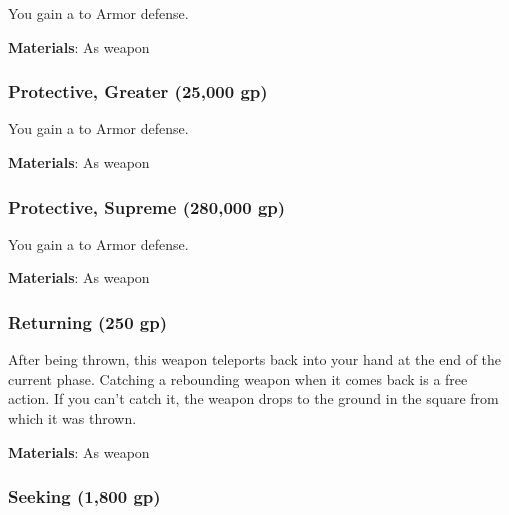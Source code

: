 You gain a   to Armor defense.



\vspace{0.25em}
\textbf{Materials}: As weapon


\lowercase{\hypertarget{item:Protective, Greater}{}}\label{item:Protective, Greater}
\hypertarget{item:Protective, Greater}{\subsubsection{Protective, Greater\hfill{} (25,000 gp)}}

You gain a   to Armor defense.



\vspace{0.25em}
\textbf{Materials}: As weapon


\lowercase{\hypertarget{item:Protective, Supreme}{}}\label{item:Protective, Supreme}
\hypertarget{item:Protective, Supreme}{\subsubsection{Protective, Supreme\hfill{} (280,000 gp)}}

You gain a   to Armor defense.



\vspace{0.25em}
\textbf{Materials}: As weapon


\lowercase{\hypertarget{item:Returning}{}}\label{item:Returning}
\hypertarget{item:Returning}{\subsubsection{Returning\hfill{} (250 gp)}}

After being thrown, this weapon teleports back into your hand at the end of the current phase.
Catching a rebounding weapon when it comes back is a free action.
If you can't catch it, the weapon drops to the ground in the square from which it was thrown.



\vspace{0.25em}
\textbf{Materials}: As weapon


\lowercase{\hypertarget{item:Seeking}{}}\label{item:Seeking}
\hypertarget{item:Seeking}{\subsubsection{Seeking\hfill{} (1,800 gp)}}

